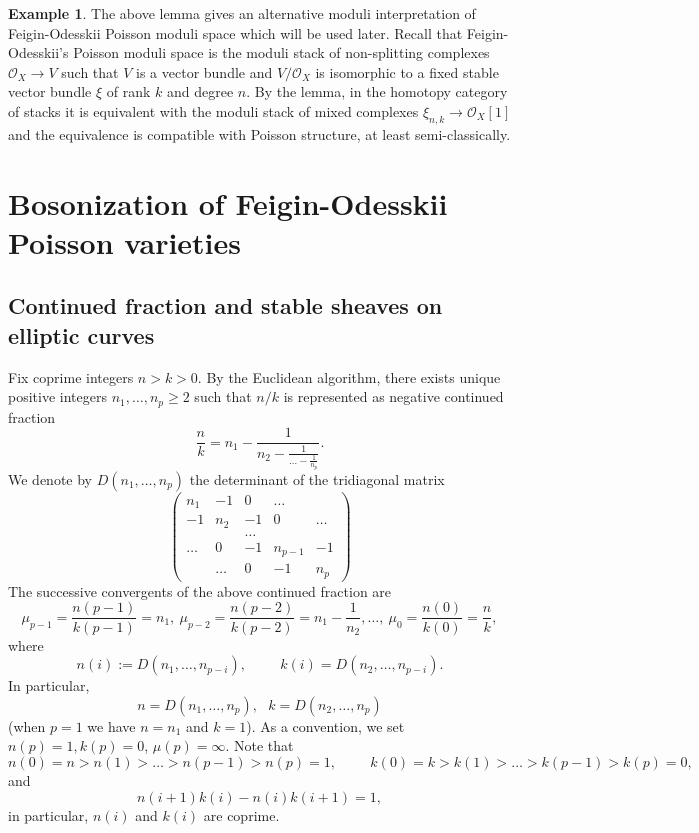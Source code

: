 \documentclass[reqno]{amsart}
\theoremstyle{definition}
\newtheorem{example}[theorem]{Example}
\theoremstyle{remark}
\newcommand{\cO}{\mathcal{O}}
\numberwithin{equation}{section}
\begin{document}
\begin{example}
The above lemma gives an alternative moduli interpretation of Feigin-Odesskii Poisson moduli space which will be used later. Recall that Feigin-Odesskii's Poisson moduli space is the moduli stack of non-splitting complexes $\cO_X\to V$ such that $V$ is a vector bundle and $V/\cO_X$ is isomorphic to a fixed stable vector bundle $\xi$ of rank $k$ and degree $n$. By the lemma, in the homotopy category of stacks it is equivalent with the moduli stack of mixed complexes $\xi_{n,k}\to \cO_X[1]$ and the equivalence is compatible with Poisson structure, at least semi-classically.
\end{example}
 
 \section{Bosonization of Feigin-Odesskii Poisson varieties}\label{sec:boson}
\subsection{Continued fraction and stable sheaves on elliptic curves}\label{sec:contfrac}
Fix coprime integers $n>k>0$. By the Euclidean algorithm, there exists unique positive integers $n_1,\ldots,n_p\geq 2$ such that $n/k$ is represented as negative continued fraction
\[
\frac{n}{k}=n_1-\frac{1}{n_2-\frac{1}{\ldots -\frac{1}{n_p}}}.
\]
We denote by $D(n_1,\ldots,n_p)$ the determinant of the tridiagonal matrix
\[\left(
\begin{array}{ccccc}
n_1 & -1 & 0 & \ldots &\\
-1 & n_2 & -1 & 0 &\ldots \\
& & \ldots & &\\
 \ldots &0& -1 & n_{p-1} & -1\\
&\ldots & 0 & -1 & n_p
\end{array}\right)
\]
The successive convergents of the above continued fraction are 
$$\mu_{p-1}=\frac{n(p-1)}{k(p-1)}=n_1, \ \mu_{p-2}=\frac{n(p-2)}{k(p-2)}=n_1-\frac{1}{n_2}, \ldots, \ \mu_0=\frac{n(0)}{k(0)}=\frac{n}{k},$$
where 
\[
n(i):=D(n_1,\ldots,n_{p-i}),\hspace{1cm} k(i)=D(n_2,\ldots,n_{p-i}).
\]
In particular,
\[
n=D(n_1,\ldots,n_p),~~~k=D(n_2,\ldots,n_p)
\] 
(when $p=1$ we have $n=n_1$ and $k=1$).
As a convention, we set $n(p)=1, k(p)=0$, $\mu(p)=\infty$. 
Note that 
\[
n(0)=n>n(1)>\ldots>n(p-1)>n(p)=1,\hspace{1cm} k(0)=k>k(1)>\ldots>k(p-1)>k(p)=0,
\] and 
\begin{equation}\label{ni-ki-det1-eq}
n(i+1)k(i)-n(i)k(i+1)=1,
\end{equation}
in particular, $n(i)$ and $k(i)$ are coprime.
\end{document}
